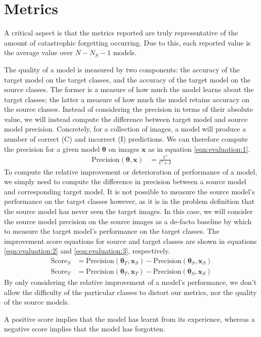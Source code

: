 \documentclass{report}
\begin{document}
	\section{Metrics}
	A critical aspect is that the metrics reported are truly representative of the amount of catastrophic forgetting occurring. Due to this, each reported value is the average value over $N-N_S-1$ models. \par
	The quality of a model is measured by two components: the accuracy of the target model on the target classes, and the accuracy of the target model on the source classes. The former is a measure of how much the model learns about the target classes; the latter a measure of how much the model retains accuracy on the source classes. Instead of considering the precision in terms of their absolute value, we will instead compute the difference between target model and source model precision. Concretely, for a collection of images, a model will produce a number of correct (C) and incorrect (I) predictions. We can therefore compute the precision for a given model $\bm{\theta}$ on images $\bm{x}$ as in equation \ref{eqn:evaluation:1}.
	\begin{align} \label{eqn:evaluation:1}
	\text{Precision}(\bm{\theta}, \bm{x}) &= \frac{C}{C+I}
	\end{align}
	To compute the relative improvement or deterioration of performance of a model, we simply need to compute the difference in precision between a source model and corresponding target model. It is not possible to measure the source model's performance on the target classes however, as it is in the problem definition that the source model has never seen the target images. In this case, we will consider the source model precision on the source images as a de-facto baseline by which to measure the target model's performance on the target classes. The improvement score equations for source and target classes are shown in equations \ref{eqn:evaluation:2} and \ref{eqn:evaluation:3}, respectively.
	\begin{align} \label{eqn:evaluation:2}
	\text{Score}_S &= \text{Precision}(\bm{\theta}_T, \bm{x}_S) - \text{Precision}(\bm{\theta}_S, \bm{x}_S) \\
	\label{eqn:evaluation:3}
	\text{Score}_T &= \text{Precision}(\bm{\theta}_T, \bm{x}_T) - \text{Precision}(\bm{\theta}_S, \bm{x}_S)
	\end{align}
	By only considering the relative improvement of a model's performance, we don't allow the difficulty of the particular classes to distort our metrics, nor the quality of the source models. \par
	A positive score implies that the model has learnt from its experience, whereas a negative score implies that the model has forgotten. \par
	
\end{document}
